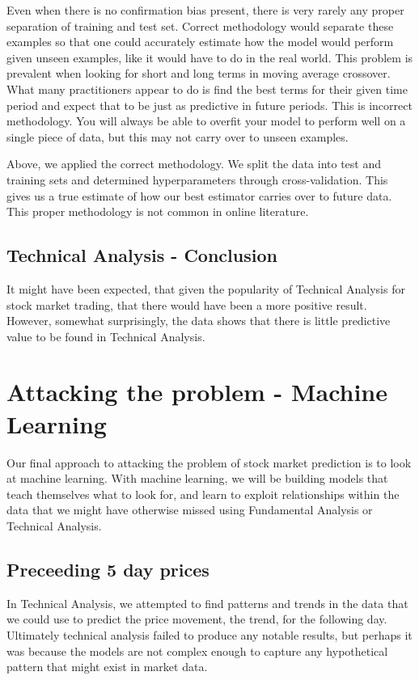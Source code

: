 \documentclass{report}
\begin{document}
Even when there is no confirmation bias present, there is very rarely any proper separation of training and test set. Correct methodology would separate these examples so that one could accurately estimate how the model would perform given unseen examples, like it would have to do in the real world. This problem is prevalent when looking for short and long terms in moving average crossover. What many practitioners appear to do is find the best terms for their given time period and expect that to be just as predictive in future periods. This is incorrect methodology. You will always be able to overfit your model to perform well on a single piece of data, but this may not carry over to unseen examples.

Above, we applied the correct methodology. We split the data into test and training sets and determined hyperparameters through cross-validation. This gives us a true estimate of how our best estimator carries over to future data. This proper methodology is not common in online literature.

\section{Technical Analysis - Conclusion}

It might have been expected, that given the popularity of Technical Analysis for stock market trading, that there would have been a more positive result. However, somewhat surprisingly, the data shows that there is little predictive value to be found in Technical Analysis. 

\chapter{Attacking the problem - Machine Learning}

Our final approach to attacking the problem of stock market prediction is to look at machine learning. With machine learning, we will be building models that teach themselves what to look for, and learn to exploit relationships within the data that we might have otherwise missed using Fundamental Analysis or Technical Analysis.

\clearpage
\section{Preceeding 5 day prices}

In Technical Analysis, we attempted to find patterns and trends in the data that we could use to predict the price movement, the trend, for the following day. Ultimately technical analysis failed to produce any notable results, but perhaps it was because the models are not complex enough to capture any hypothetical pattern that might exist in market data.
\end{document}
